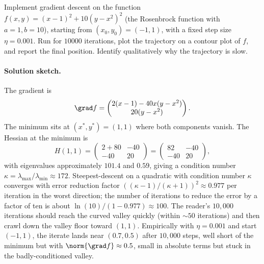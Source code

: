 \begin{exercise}
Implement gradient descent on the function $f(x, y) = (x - 1)^{2} +
10 (y - x^{2})^{2}$ (the Rosenbrock function with $a = 1, b = 10$),
starting from $(x_{0}, y_{0}) = (-1, 1)$, with a fixed step size
$\eta = 0.001$. Run for $10000$ iterations, plot the trajectory
on a contour plot of $f$, and report the final position. Identify
qualitatively why the trajectory is slow.

\paragraph{Solution sketch.} The gradient is
\[
\grad f = \begin{pmatrix} 2(x - 1) - 40 x (y - x^{2}) \\
20 (y - x^{2}) \end{pmatrix}.
\]
The minimum sits at $(x^{*}, y^{*}) = (1, 1)$ where both components
vanish. The Hessian at the minimum is
\[
H(1, 1) = \begin{pmatrix} 2 + 80 & -40 \\ -40 & 20 \end{pmatrix} =
\begin{pmatrix} 82 & -40 \\ -40 & 20 \end{pmatrix},
\]
with eigenvalues approximately $101.4$ and $0.59$, giving a
condition number $\kappa = \lambda_{\max}/\lambda_{\min} \approx
172$. Steepest-descent on a quadratic with condition number $\kappa$
converges with error reduction factor $((\kappa - 1)/(\kappa + 1))^
{2} \approx 0.977$ per iteration in the worst direction; the
number of iterations to reduce the error by a factor of ten is
about $\ln(10)/(1 - 0.977) \approx 100$. The reader's $10{,}000$
iterations should reach the curved valley quickly (within
$\sim 50$ iterations) and then crawl down the valley floor toward
$(1, 1)$. Empirically with $\eta = 0.001$ and start $(-1, 1)$,
the iterate lands near $(0.7, 0.5)$ after $10{,}000$ steps, well
short of the minimum but with $\norm{\grad f} \approx 0.5$, small
in absolute terms but stuck in the badly-conditioned valley.


\end{exercise}
